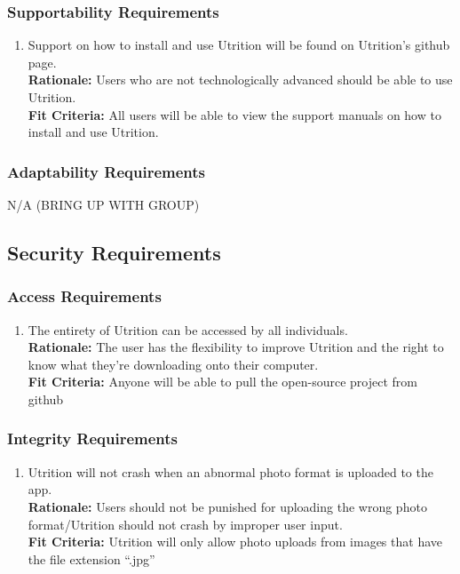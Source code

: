 \documentclass[12pt]{article}
\begin{document}
{\subsubsection{Supportability Requirements}
\begin{enumerate}[{MS}2. ] 
	\item Support on how to install and use Utrition will be found on Utrition’s github page. \\
	\textbf{Rationale:} Users who are not technologically advanced should be able to use Utrition.\\	
	\textbf{Fit Criteria:} All users will be able to view the support manuals on how to install and use Utrition.
\end{enumerate}

\subsubsection{Adaptability Requirements}
\hspace{1.5cm}N/A (BRING UP WITH GROUP) 

\subsection{Security Requirements}

\subsubsection{Access Requirements}
\begin{enumerate}[{SR}1. ] 
	\item The entirety of Utrition can be accessed by all individuals. \\
	\textbf{Rationale:} The user has the flexibility to improve Utrition and the right to know what they’re downloading onto their computer.  \\	
	\textbf{Fit Criteria:} Anyone will be able to pull the open-source project from github
\end{enumerate}

\subsubsection{Integrity Requirements}
\begin{enumerate}[{SR}2. ] 
	\item Utrition will not crash when an abnormal photo format is uploaded to the app. \\
	\textbf{Rationale:} Users should not be punished for uploading the wrong photo format/Utrition should not crash by improper user input.\\	
	\textbf{Fit Criteria:}  Utrition will only allow photo uploads from images that have the file extension “.jpg”
\end{enumerate}

}
\end{document}
